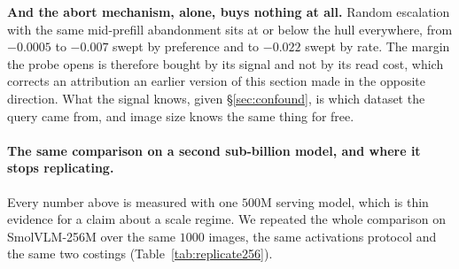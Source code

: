\documentclass[10pt,twocolumn]{article}
\theoremstyle{plain}
\begin{document}
\textbf{And the abort mechanism, alone, buys nothing at all.} Random escalation
with the same mid-prefill abandonment sits at or below the hull everywhere,
from $-0.0005$ to $-0.007$ swept by preference and to $-0.022$ swept by rate.
The margin the probe opens is therefore bought by its signal and not by its
read cost, which corrects an attribution an earlier version of this section
made in the opposite direction. What the signal knows, given
\S\ref{sec:confound}, is which dataset the query came from, and image size
knows the same thing for free.



\paragraph{The same comparison on a second sub-billion model, and where it
stops replicating.} Every number above is measured with one $500$M serving
model, which is thin evidence for a claim about a scale regime. We repeated the
whole comparison on SmolVLM-256M over the same $1000$ images, the same
activations protocol and the same two costings (Table~\ref{tab:replicate256}).

\begin{table}[t]
\centering\small
\setlength{\tabcolsep}{3.5pt}
\caption{The mixture hull comparison repeated with a $256$M serving model,
$30$ resampled folds. Two results replicate and one does not.}
\label{tab:replicate256}
\end{table}
\end{document}
